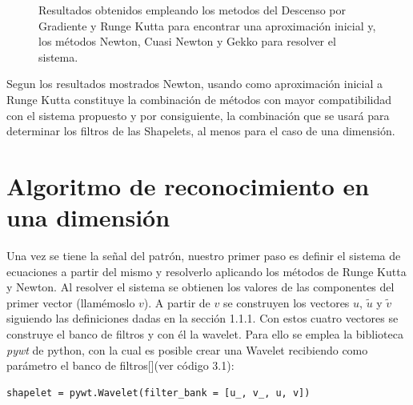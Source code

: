 \begin{figure}[h]
\begin{center}
{        \label{RK-CN}}
    \caption{Resultados obtenidos empleando los metodos del Descenso por Gradiente y Runge Kutta para encontrar una aproximaci\'on inicial y, los m\'etodos Newton, Cuasi Newton y Gekko para resolver el sistema.}
    \label{metodos-combinados}
  \end{center}
\end{figure}

\par Segun los resultados mostrados Newton, usando como aproximaci\'on inicial a Runge Kutta constituye la combinaci\'on de m\'etodos con mayor compatibilidad con el sistema propuesto y por consiguiente, la combinaci\'on que se usar\'a para determinar los filtros de las Shapelets, al menos para el caso de una dimensi\'on.\\

\section{Algoritmo de reconocimiento en una dimensi\'on}

\par Una vez se tiene la se\~nal del patr\'on, nuestro primer paso es definir el sistema de ecuaciones a partir del mismo y resolverlo aplicando los m\'etodos de Runge Kutta y Newton. Al resolver el sistema se obtienen los valores de las componentes del primer vector (llam\'emoslo $v$). A partir de $v$ se construyen los vectores $u$, $\tilde{u}$ y $\tilde{v}$ siguiendo las definiciones dadas en la secci\'on 1.1.1. Con estos cuatro vectores se construye el banco de filtros y con \'el la wavelet. Para ello se emplea la biblioteca \textit{pywt} de python, con la cual es posible crear una Wavelet recibiendo como par\'ametro el banco de filtros[\cite{14}](ver c\'odigo 3.1):\\

\begin{lstlisting}[caption=Creaci\'on de una wavelet a partir del banco de filtros]
shapelet = pywt.Wavelet(filter_bank = [u_, v_, u, v])
\end{lstlisting}

